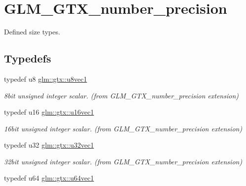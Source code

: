 \hypertarget{group__gtx__number__precision}{\section{G\-L\-M\-\_\-\-G\-T\-X\-\_\-number\-\_\-precision}
\label{group__gtx__number__precision}
}


Defined size types.  


\subsection*{Typedefs}
\begin{DoxyCompactItemize}
\item 
\hypertarget{group__gtx__number__precision_ga35ae7849593a354420e4f52d1b36c2d6}{typedef u8 \hyperlink{group__gtx__number__precision_ga35ae7849593a354420e4f52d1b36c2d6}{glm\-::gtx\-::u8vec1}}\label{group__gtx__number__precision_ga35ae7849593a354420e4f52d1b36c2d6}

\begin{DoxyCompactList}\small\item\em 8bit unsigned integer scalar. (from G\-L\-M\-\_\-\-G\-T\-X\-\_\-number\-\_\-precision extension) \end{DoxyCompactList}\item 
\hypertarget{group__gtx__number__precision_ga807d7e5f24e981b1575bd40ca159781d}{typedef u16 \hyperlink{group__gtx__number__precision_ga807d7e5f24e981b1575bd40ca159781d}{glm\-::gtx\-::u16vec1}}\label{group__gtx__number__precision_ga807d7e5f24e981b1575bd40ca159781d}

\begin{DoxyCompactList}\small\item\em 16bit unsigned integer scalar. (from G\-L\-M\-\_\-\-G\-T\-X\-\_\-number\-\_\-precision extension) \end{DoxyCompactList}\item 
\hypertarget{group__gtx__number__precision_gac46a7890b20928df83e734c3ea9557d4}{typedef u32 \hyperlink{group__gtx__number__precision_gac46a7890b20928df83e734c3ea9557d4}{glm\-::gtx\-::u32vec1}}\label{group__gtx__number__precision_gac46a7890b20928df83e734c3ea9557d4}

\begin{DoxyCompactList}\small\item\em 32bit unsigned integer scalar. (from G\-L\-M\-\_\-\-G\-T\-X\-\_\-number\-\_\-precision extension) \end{DoxyCompactList}\item 
\hypertarget{group__gtx__number__precision_ga92812a1d7e746bcaba61d2f5a64afc52}{typedef u64 \hyperlink{group__gtx__number__precision_ga92812a1d7e746bcaba61d2f5a64afc52}{glm\-::gtx\-::u64vec1}}\label{group__gtx__number__precision_ga92812a1d7e746bcaba61d2f5a64afc52}


\end{DoxyCompactItemize}
